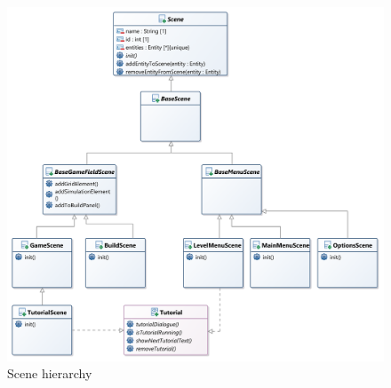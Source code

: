 \begin{figure}
    \centering
    \includegraphics[width=\textwidth]{Pictures/res/implementation/scenes-hierarchy}
    \caption{Scene hierarchy}
    \label{fig:scenes-hierachry}
\end{figure}

